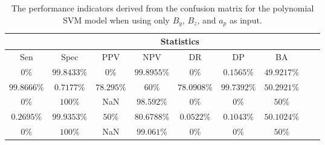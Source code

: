 \begin{table}[!ht]
	\centering
	\begin{tabular}{|c|c|c|c|c|c|c|c|c|}
		\hline
		 & \multicolumn{7}{c|}{Statistics} \\ \hline
		Sen & Spec & PPV & NPV & DR & DP & BA \\ \hline
		$0\%$ & $99.8433\%$ & $0\%$ & $99.8955\%$ & $0\%$ & $0.1565\%$ & $49.9217\%$ \\ \hline
		$99.8666\%$ & $0.7177\%$ & $78.295\%$ & $60\%$ & $78.0908\%$ & $99.7392\%$ & $50.2921\%$ \\ \hline
		$0\%$ & $100\%$ & NaN & $98.592\%$ & $0\%$ & $0\%$ & $50\%$ \\ \hline
		$0.2695\%$ & $99.9353\%$ & $50\%$ & $80.6788\%$ & $0.0522\%$ & $0.1043\%$ & $50.1024\%$ \\ \hline
		$0\%$ & $100\%$ & NaN & $99.061\%$ & $0\%$ & $0\%$ & $50\%$ \\ \hline
	\end{tabular}
	\caption{The performance indicators derived from the confusion matrix for the polynomial SVM model when using only $B_{y}$, $B_{z}$, and $a_{p}$ as input.}
	\label{tab:cs:yzap:svmPoly}
\end{table}
